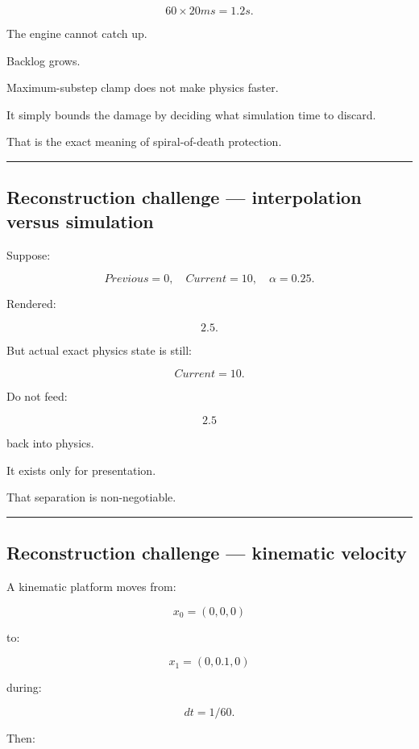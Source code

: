 \[
60\times20ms=1.2s.
\]

The engine cannot catch up.

Backlog grows.

Maximum-substep clamp does not make physics faster.

It simply bounds the damage by deciding what simulation time to discard.

That is the exact meaning of spiral-of-death protection.

\begin{center}\rule{0.5\linewidth}{0.5pt}\end{center}

\subsection{Reconstruction challenge --- interpolation versus simulation}\label{06-engine-ii-ch038-reconstruction-challenge-interpolation-versus-simulation}

Suppose:

\[
Previous=0,
\quad
Current=10,
\quad
\alpha=0.25.
\]

Rendered:

\[
2.5.
\]

But actual exact physics state is still:

\[
Current=10.
\]

Do not feed:

\[
2.5
\]

back into physics.

It exists only for presentation.

That separation is non-negotiable.

\begin{center}\rule{0.5\linewidth}{0.5pt}\end{center}

\subsection{Reconstruction challenge --- kinematic velocity}\label{06-engine-ii-ch038-reconstruction-challenge-kinematic-velocity}

A kinematic platform moves from:

\[
x_0=(0,0,0)
\]

to:

\[
x_1=(0,0.1,0)
\]

during:

\[
dt=1/60.
\]

Then:

